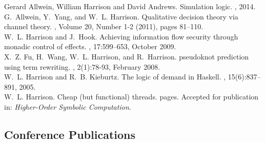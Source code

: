 \documentclass[12pt]{article} %
\begin{document}
Gerard Allwein, William Harrison and David Andrews.
\newblock Simulation logic.
, 2014.
\\

G.~Allwein, Y.~Yang, and W.~L. Harrison.
\newblock Qualitative decision theory via channel theory.
, Volume 20, Number 1-2 (2011), pages 81--110.
\\


W.~L. Harrison and J.~Hook.
\newblock Achieving information flow security through monadic control of
  effects.
, 17:599--653, October 2009.
\\

X.~Z. Fu, H.~Wang, W.~L. Harrison, and R.~Harrison.
 pseudoknot prediction using term rewriting.
, 2(1):78-93, February 2008.
\\


W.~L. Harrison and R.~B. Kieburtz.
\newblock The logic of demand in {H}askell.
, 15(6):837--891, 2005.
\\


W.~L. Harrison.
\newblock Cheap (but functional) threads.
 pages. Accepted for publication in: {\em Higher-Order Symbolic Computation}. 

\subsection*{Conference Publications}
\end{document}
